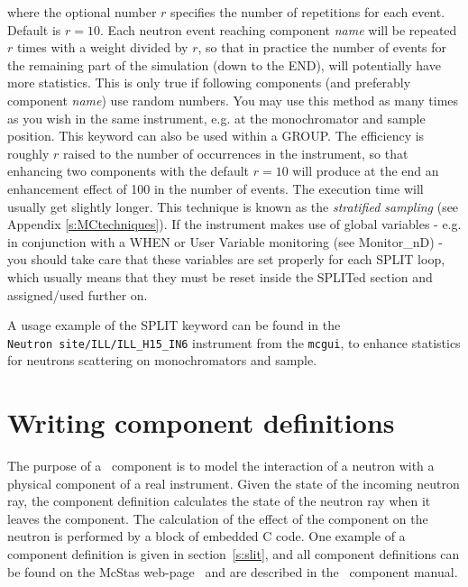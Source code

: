 where the optional number $r$ specifies the number of repetitions for each
event. Default is $r=10$.  Each neutron event reaching component {\it name} will
be repeated $r$ times with a weight divided by $r$, so that in practice the
number of events for the remaining part of the simulation (down to the END),
will potentially have more statistics. This is only true if following components
(and preferably component {\it name}) use random numbers. You may use this
method as many times as you wish in the same instrument, e.g. at the
monochromator and sample position. This keyword can also be used within a
GROUP. The efficiency is roughly $r$ raised to the number of occurrences in the
instrument, so that enhancing two components with the default $r=10$ will
produce at the end an enhancement effect of 100 in the number of events. The
execution time will usually get slightly longer. This technique is known as the
\emph{stratified sampling} (see Appendix \ref{s:MCtechniques}). If the
instrument makes use of global variables - e.g. in conjunction with a WHEN or
User Variable monitoring (see Monitor\_nD) - you should take care that these
variables are set properly for each SPLIT loop, which usually means that they
must be reset inside the SPLITed section and assigned/used further
on. 

A usage example of the SPLIT keyword can be found in the \\
\verb+Neutron site/ILL/ILL_H15_IN6+ instrument from the \verb+mcgui+, to enhance
statistics for neutrons scattering on monochromators and sample.

\section{Writing component definitions}
\label{s:compdefs}

The purpose of a \MCS\ component is to model the interaction of a
neutron with a physical component of a real instrument. Given the
state of the incoming neutron ray, the
component definition calculates the state of the neutron ray when it leaves
the component.  The calculation of the effect of the component on the
neutron is performed by a block of embedded C code.
One example of a component definition is given in section~\ref{s:slit}, and all
component definitions can be found on the McStas
web-page~\cite{mcstas_webpage} and are described in the \MCS\ component manual.

